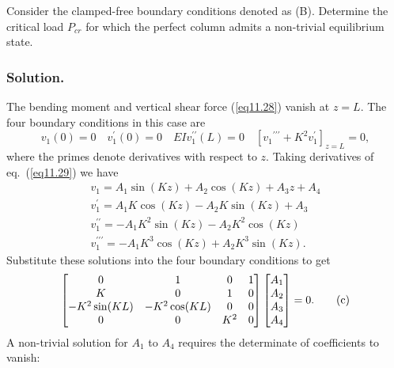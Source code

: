 \documentclass{AeroStructure-ERJohnson}
\begin{document}
\begin{example} \label{ex11.1}%
Consider the clamped-free boundary conditions denoted as (B). Determine the critical load $P_{cr}$ for which the perfect column admits a non-trivial equilibrium state.

\subsubsection{Solution.} The bending moment and vertical shear force (\ref{eq11.28}) vanish at $z = L$. The four boundary conditions in this case are
\begin{equation}
 v_{1}(0)=0 \quad v_{1}^{\prime}(0)=0 \quad E I v_{1}^{\prime \prime}(L)=0 \quad\left[v_{1}{ }^{\prime\prime\prime}+K^{2} v_{1}^{\prime}\right]_{z=L}=0 , \label{eq11.1.a}\tag{a}
\end{equation}
where the primes denote derivatives with respect to $z$. Taking derivatives of eq.~(\ref{eq11.29}) we have
\begin{gather}
v_{1}=A_{1} \sin (K z)+A_{2} \cos (K z)+A_{3} z+A_{4} \nonumber\\
v_{1}^{\prime}=A_{1} K \cos (K z)-A_{2} K \sin (K z)+A_{3} \nonumber\\
v_{1}^{\prime \prime}=-A_{1} K^{2} \sin (K z)-A_{2} K^{2} \cos (K z) \nonumber\\
v_{1}^{\prime\prime\prime}=-A_{1} K^{3} \cos (K z)+A_{2} K^{3} \sin (K z). \label{eq11.1.b}\tag{b}
\end{gather}
Substitute these solutions into the four boundary conditions to get
\begin{gather}
\left[\begin{array}{@{}cccc@{}} 0 & 1 & 0 & 1 \\ K & 0 & 1 & 0 \\ -K^{2} \sin (K L) & -K^{2} \cos (K L) & 0 & 0 \\ 0 & 0 & K^{2} & 0 \end{array}\right]\left[\begin{array}{@{}c@{}} A_{1} \\ A_{2} \\ A_{3} \\ A_{4} \end{array}\right]=0. \label{eq11.1.c}\tag{c}
\end{gather}
A non-trivial solution for $\textit{A}_1$ to $\textit{A}_4$ requires the determinate of coefficients to vanish:
\begin{equation}

\end{equation}
\end{example}
\end{document}

